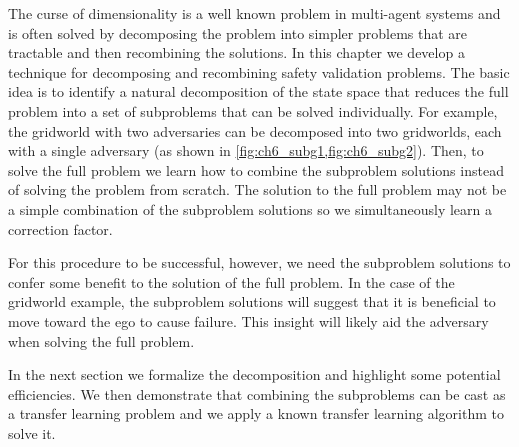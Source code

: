 The curse of dimensionality is a well known problem in multi-agent systems and is often solved by decomposing the problem into simpler problems that are tractable and then recombining the solutions. In this chapter we develop a technique for decomposing and recombining safety validation problems. The basic idea is to identify a natural decomposition of the state space that reduces the full problem into a set of subproblems that can be solved individually. For example, the gridworld with two adversaries can be decomposed into two gridworlds, each with a single adversary (as shown in \cref{fig:ch6_subg1,fig:ch6_subg2}). Then, to solve the full problem we learn how to combine the subproblem solutions instead of solving the problem from scratch. The solution to the full problem may not be a simple combination of the subproblem solutions so we simultaneously learn a correction factor. 

For this procedure to be successful, however, we need the subproblem solutions to confer some benefit to the solution of the full problem. In the case of the gridworld example, the subproblem solutions will suggest that it is beneficial to move toward the ego to cause failure. This insight will likely aid the adversary when solving the full problem.

In the next section we formalize the decomposition and highlight some potential efficiencies. We then demonstrate that combining the subproblems can be cast as a transfer learning problem and we apply a known transfer learning algorithm to solve it. 


